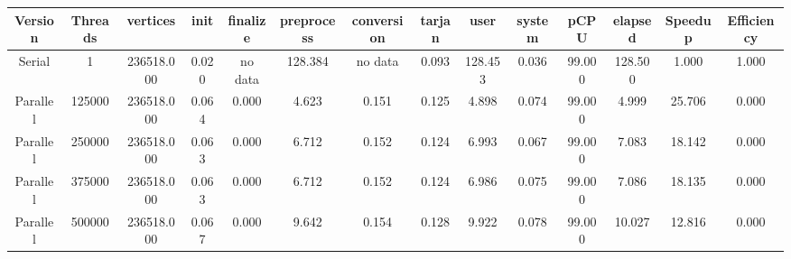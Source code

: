 \begin{tabular}{|c|c|c|c|c|c|c|c|c|c|c|c|c|c|}
\toprule
 Version &  Threads &   vertices &  init & finalize &  preprocess & conversion &  tarjan &    user &  system &   pCPU &  elapsed &  Speedup &  Efficiency \\
\midrule
  Serial &        1 & 236518.000 & 0.020 &  no data &     128.384 &    no data &   0.093 & 128.453 &   0.036 & 99.000 &  128.500 &    1.000 &       1.000 \\
Parallel &   125000 & 236518.000 & 0.064 &    0.000 &       4.623 &      0.151 &   0.125 &   4.898 &   0.074 & 99.000 &    4.999 &   25.706 &       0.000 \\
Parallel &   250000 & 236518.000 & 0.063 &    0.000 &       6.712 &      0.152 &   0.124 &   6.993 &   0.067 & 99.000 &    7.083 &   18.142 &       0.000 \\
Parallel &   375000 & 236518.000 & 0.063 &    0.000 &       6.712 &      0.152 &   0.124 &   6.986 &   0.075 & 99.000 &    7.086 &   18.135 &       0.000 \\
Parallel &   500000 & 236518.000 & 0.067 &    0.000 &       9.642 &      0.154 &   0.128 &   9.922 &   0.078 & 99.000 &   10.027 &   12.816 &       0.000 \\
\bottomrule
\end{tabular}
